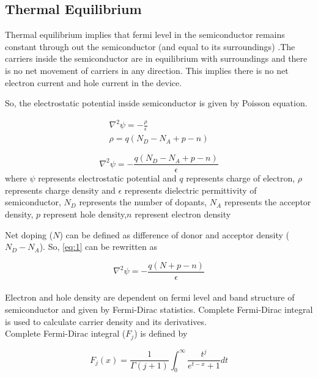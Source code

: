 \subsection{Thermal Equilibrium}
Thermal equilibrium implies that fermi level in the semiconductor remains constant through out the semiconductor (and equal to its surroundings) .The carriers inside the semiconductor are in equilibrium with surroundings and there is no net movement of carriers in any direction. This implies there is no net electron current and hole current in the device. 

So, the electrostatic potential inside semiconductor is given by Poisson equation. 

\begin{align*}
\nabla^2 \psi = -\frac{\rho}{\epsilon}\\
\rho = q(N_D - N_A + p - n)
\end{align*}

\begin{equation}
\nabla^2 \psi = -\frac{q(N_D - N_A + p - n)}{\epsilon} \tag{1.1} \label{eq:1}
\end{equation} 
where $\psi$ represents electrostatic potential and $q$ represents charge of electron, $\rho$ represents charge density and $\epsilon$ represents dielectric permittivity of semiconductor, $N_D$ represents the number of dopants, $N_A$ represents the acceptor density, $p$ represent hole density,$n$ represent electron density

Net doping ($N$) can be defined as difference of donor and acceptor density ($N_D-N_A$). So, \eqref{eq:1} can be rewritten as 

\begin{equation}
\nabla^2 \psi = -\frac{q(N + p - n)}{\epsilon} \tag{1.2}\label{eq:2}
\end{equation}\\

Electron and hole density are dependent on fermi level and band structure of semiconductor and given by Fermi-Dirac statistics. Complete Fermi-Dirac integral is used to calculate carrier density and its derivatives.\\

Complete Fermi-Dirac integral ($F_j$) is defined by

\begin{equation}
  F_j(x) = \frac{1}{\Gamma(j+1)}\int^\infty_0 \frac{t^j}{e^{t-x}+1} dt \tag{1.3} \label{eq:3}
\end{equation} 

